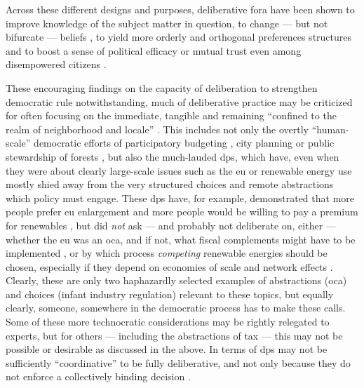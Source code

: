 
Across these different designs and purposes, deliberative fora have been shown to improve knowledge of the subject matter in question, to change --- but not bifurcate --- beliefs \citep{Fishkin2009}, to yield more orderly and orthogonal preferences structures \citep{Farrar2003} and to boost a sense of political efficacy or mutual trust even among disempowered citizens \citep{Karpowitz2009}.

These encouraging findings on the capacity of deliberation to strengthen democratic rule notwithstanding, much of deliberative practice may be criticized for often focusing on the immediate, tangible and remaining ``confined to the realm of neighborhood and locale'' \citep[17]{FungWright-2001-aa}.
This includes not only the overtly ``human-scale'' democratic efforts \citep[759]{Boggs-1997-aa} of participatory budgeting \citep{Sousa-Santos-1998-aa}, city planning \citep{Sokoloff2005} or public stewardship of forests \citep{Cheng2005}, but also the much-lauded \glspl{dp}, which have, even when they were about clearly large-scale issues such as the \gls{eu} \citep{Fishkin2009} or renewable energy use \citep{LehrGuild-2003-aa} mostly shied away from the very structured choices and remote abstractions which policy must engage.
These \glspl{dp} have, for example, demonstrated that more people prefer \gls{eu} enlargement and more people would be willing to pay a premium for renewables \citep[157]{Fishkin2009}, but did \emph{not} ask --- and probably not deliberate on, either --- whether the \gls{eu} was an \gls{oca}, and if not, what fiscal complements might have to be implemented \citep[for example,][]{Mundell1961}, or by which process \emph{competing} renewable energies should be chosen, especially if they depend on economies of scale and network effects \citep[for example, ][]{Krugman-1990-aa}.
Clearly, these are only two haphazardly selected examples of abstractions (\gls{oca}) and choices (infant industry regulation) relevant to these topics, but equally clearly, someone, somewhere in the democratic process has to make these calls.%
Some of these more technocratic considerations may be rightly relegated to experts, but for others --- including the abstractions of tax --- this may not be possible or desirable as discussed in the above.
In terms of \citeauthor{Landwehr2010} \glspl{dp} may not be sufficiently ``coordinative'' to be fully deliberative, and not only because they do not enforce a collectively binding decision \citeyearpar[377]{Landwehr2010}.
